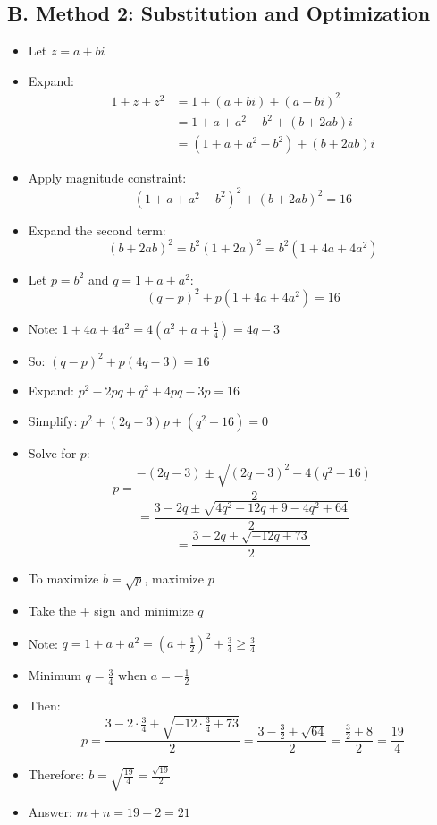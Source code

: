 \documentclass[11pt]{article}
\begin{document}
\begin{conversionbox}
\subsection*{B. Method 2: Substitution and Optimization}
\begin{itemize}[leftmargin=*]
    \item Let $z = a + bi$
    \item Expand:
    \begin{align*}
    1 + z + z^2 &= 1 + (a+bi) + (a+bi)^2\\
    &= 1 + a + a^2 - b^2 + (b + 2ab)i\\
    &= (1 + a + a^2 - b^2) + (b + 2ab)i
    \end{align*}
    \item Apply magnitude constraint:
    \[(1 + a + a^2 - b^2)^2 + (b + 2ab)^2 = 16\]
    \item Expand the second term:
    \[(b + 2ab)^2 = b^2(1 + 2a)^2 = b^2(1 + 4a + 4a^2)\]
    \item Let $p = b^2$ and $q = 1 + a + a^2$:
    \[(q - p)^2 + p(1 + 4a + 4a^2) = 16\]
    \item Note: $1 + 4a + 4a^2 = 4(a^2 + a + \frac{1}{4}) = 4q - 3$
    \item So: $(q - p)^2 + p(4q - 3) = 16$
    \item Expand: $p^2 - 2pq + q^2 + 4pq - 3p = 16$
    \item Simplify: $p^2 + (2q - 3)p + (q^2 - 16) = 0$
    \item Solve for $p$:
    \[p = \frac{-(2q-3) \pm \sqrt{(2q-3)^2 - 4(q^2-16)}}{2}\]
    \[= \frac{3-2q \pm \sqrt{4q^2 - 12q + 9 - 4q^2 + 64}}{2}\]
    \[= \frac{3-2q \pm \sqrt{-12q + 73}}{2}\]
    \item To maximize $b = \sqrt{p}$, maximize $p$
    \item Take the $+$ sign and minimize $q$
    \item Note: $q = 1 + a + a^2 = (a + \frac{1}{2})^2 + \frac{3}{4} \geq \frac{3}{4}$
    \item Minimum $q = \frac{3}{4}$ when $a = -\frac{1}{2}$
    \item Then:
    \[p = \frac{3 - 2 \cdot \frac{3}{4} + \sqrt{-12 \cdot \frac{3}{4} + 73}}{2} = \frac{3 - \frac{3}{2} + \sqrt{64}}{2} = \frac{\frac{3}{2} + 8}{2} = \frac{19}{4}\]
    \item Therefore: $b = \sqrt{\frac{19}{4}} = \frac{\sqrt{19}}{2}$
    \item Answer: $m + n = 19 + 2 = 21$
\end{itemize}


\end{conversionbox}
\end{document}
